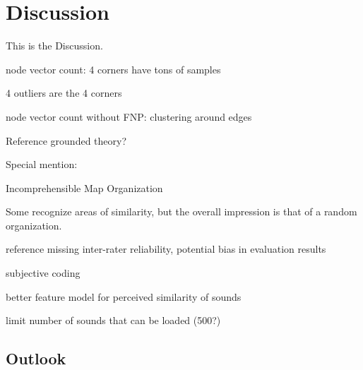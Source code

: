 
\section{Discussion}
\label{sec:discussion}
This is the Discussion.

node vector count: 4 corners have tons of samples

4 outliers are the 4 corners

node vector count without FNP: clustering around edges

Reference grounded theory?

Special mention:

Incomprehensible Map Organization

Some recognize areas of similarity, but the overall impression is that of a
random organization.


reference missing inter-rater reliability,
potential bias in evaluation results

subjective coding

better feature model for perceived similarity of sounds

limit number of sounds that can be loaded (500?)



\subsection{Outlook}
\label{subsec:outlook}
